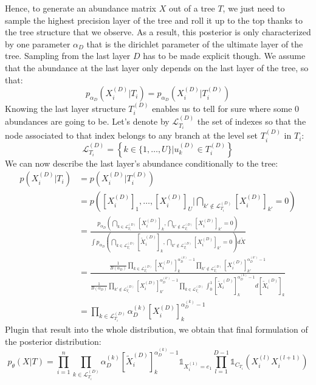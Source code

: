 Hence, to generate an abundance matrix $X$ out of a tree $T$, we just need to sample the highest precision layer of the tree
and roll it up to the top thanks to the tree structure that we observe.
As a result, this posterior is only characterized by one parameter $\alpha_D$ that is the dirichlet parameter of the ultimate layer of the tree. Sampling from the last layer $D$ has to be made explicit though.
We assume that the abundance at the last layer only depends on the last layer of the tree, so that:
$$
p_{\alpha_D}(X_i^{(D)} | T_i) = p_{\alpha_D}(X_i^{(D)} | T_i^{(D)})
$$
\newcommand{\nodeindexset}{\mathcal{L}^{(D)}_{T_i}}
Knowing the last layer structure $T_i^{(D)}$ enables us to tell for sure where some $0$ abundances are going to be.
Let's denote by $\nodeindexset$ the set of indexes so that the node associated to that index belongs to any branch at the level set $T_i^{(D)}$ in $T_i$:
$$
\nodeindexset = \left\{k \in \{1, \dots, U\} | u_k^{(D)} \in T_i^{(D)}\right\}
$$
We can now describe the last layer's abundance conditionally to the tree:
$$
\begin{align}
    p(X_i^{(D)} | T_i) &= p(X_i^{(D)} | T_i^{(D)}) \\
                                &= p\left(\left[X_i^{(D)}\right]_1, \dots, \left[X_i^{(D)}\right]_U | \bigcap_{k' \notin \nodeindexset} \left[X_i^{(D)}\right]_{k'} = 0\right) \\
                                &= \frac{p_{\alpha_D}\left( \bigcap_{k \in \nodeindexset} \left[X_i^{(D)}\right]_{k}, \bigcap_{k' \notin \nodeindexset} \left[X_i^{(D)}\right]_{k'} = 0 \right)}{\int p_{\alpha_D}\left( \bigcap_{k \in \nodeindexset} \left[\tilde{X}_i^{(D)}\right]_{k}, \bigcap_{k' \notin \nodeindexset} \left[X_i^{(D)}\right]_{k'} = 0 \right) d\tilde{X}} \\
                                &= \frac{\frac{1}{B(\alpha_D)} \prod_{k \in \nodeindexset} \left[X_i^{(D)}\right]_{k}^{\alpha_D^{(k)} - 1} \prod_{k' \notin \nodeindexset} \left[X_i^{(D)}\right]_{k'}^{\alpha_D^{(k')} - 1}}{\frac{1}{B(\alpha_D)} \prod_{k' \notin \nodeindexset} \left[X_i^{(D)}\right]_{k'}^{\alpha_D^{(k')} - 1} \prod_{k \in \nodeindexset} \int_{0}^{1} \left[\tilde{X}_i^{(D)}\right]_k^{\alpha_D^{(k)} - 1} d\left[\tilde{X}_i^{(D)}\right]_k} \\
                                &= \prod_{k \in \nodeindexset} \alpha_D^{(k)} \left[X_i^{(D)}\right]_k^{\alpha_D^{(k)} - 1}
\end{align}
$$
Plugin that result into the whole distribution, we obtain that final formulation of the posterior distribution:
$$
    p_{\theta}(X | T) = \prod_{i=1}^n \prod_{k \in \nodeindexset} \alpha_D^{(k)} \left[\tilde{X}_i^{(D)}\right]_k^{\alpha_D^{(k)} - 1} \mathds{1}_{X_i^{(1)} = e_1} \prod_{l=1}^{D-1} \mathds{1}_{C_{T_i}}(X_i^{(l)} X_i^{(l+1)})
$$


